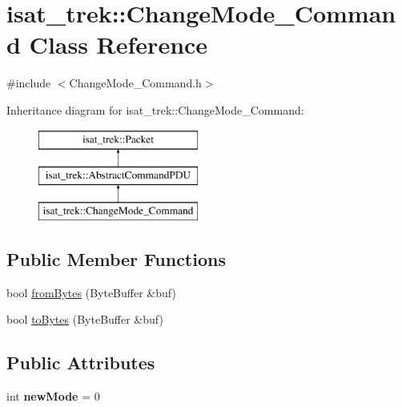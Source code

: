 \hypertarget{classisat__trek_1_1_change_mode___command}{}\section{isat\+\_\+trek\+:\+:Change\+Mode\+\_\+\+Command Class Reference}
\label{classisat__trek_1_1_change_mode___command}


{\ttfamily \#include $<$Change\+Mode\+\_\+\+Command.\+h$>$}

Inheritance diagram for isat\+\_\+trek\+:\+:Change\+Mode\+\_\+\+Command\+:\begin{figure}[H]
\begin{center}
\leavevmode
\includegraphics[height=3.000000cm]{classisat__trek_1_1_change_mode___command}
\end{center}
\end{figure}
\subsection*{Public Member Functions}
\begin{DoxyCompactItemize}
\item 
bool \hyperlink{classisat__trek_1_1_change_mode___command_a9b25f1596746890d0c4f93f089eadce6}{from\+Bytes} (Byte\+Buffer \&buf)
\item 
bool \hyperlink{classisat__trek_1_1_change_mode___command_abd1d9cdd783958408fad57595f28c110}{to\+Bytes} (Byte\+Buffer \&buf)
\end{DoxyCompactItemize}
\subsection*{Public Attributes}
\begin{DoxyCompactItemize}
\item 
int {\bfseries new\+Mode} = 0\hypertarget{classisat__trek_1_1_change_mode___command_a7755f2e017223ca39bd62ee72c83ca24}{}\label{classisat__trek_1_1_change_mode___command_a7755f2e017223ca39bd62ee72c83ca24}

\end{DoxyCompactItemize}



